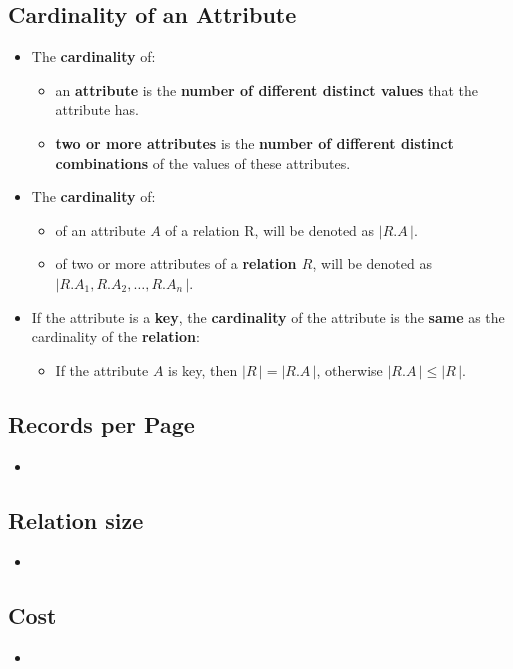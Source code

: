 \documentclass[10pt]{article}
\begin{document}
\subsection{Cardinality of an Attribute}
	\begin{itemize}
	\item
	The \textbf{cardinality} of:
		\begin{itemize}
		\item
		an \textbf{attribute} is the \textbf{number of different distinct values} that the attribute has.
		\item
		\textbf{two or more attributes} is the \textbf{number of different distinct combinations} of the values of these attributes.
		\end{itemize}	 
	\item
	The \textbf{cardinality} of:
		\begin{itemize}
		\item
		of an attribute $A$ of a relation R, will be denoted as $|R.A\,|$.
		\item
		of two or more attributes of a \textbf{relation $R$}, will be denoted as $| R.A_1, R.A_2, \dots, R.A_n\,|$.
		\end{itemize}
	\item
	If the attribute is a \textbf{key}, the \textbf{cardinality} of the attribute is the \textbf{same} as the cardinality of the \textbf{relation}:
		\begin{itemize}
		\item
		If the attribute $A$ is key, then $|R\,| = |R.A\,|$, otherwise $|R.A\,| \leq |R\,|$.
		\end{itemize}
	\end{itemize}

\subsection{Records per Page}
	\begin{itemize}
	\item
	\end{itemize}

\subsection{Relation size}
	\begin{itemize}
	\item
	\end{itemize}

\subsection{Cost}
	\begin{itemize}
	\item
	\end{itemize}
\end{document}
